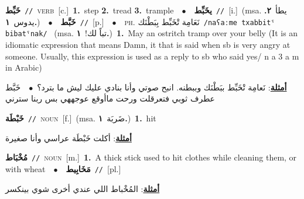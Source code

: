 \documentclass[10pt,a4paper,twoside]{article} %
\begin{document}
\begin{multicols}{2}
{{\setlength\topsep{0pt}\textbf{\foreignlanguage{arabic}{خَبِّط}}\ {\color{gray}\texttt{//}\color{black}}\ \textsc{verb}\ [c.]\ \textbf{1.}~step  \textbf{2.}~tread  \textbf{3.}~trample\ \ $\bullet$\ \ \setlength\topsep{0pt}\textbf{\foreignlanguage{arabic}{يخَبِّط}}\ {\color{gray}\texttt{//}\color{black}}\ [i.]\ \color{gray}(msa. \foreignlanguage{arabic}{يطأ}~\foreignlanguage{arabic}{\textbf{٢.}}  \foreignlanguage{arabic}{يدوس}~\foreignlanguage{arabic}{\textbf{١.}})\color{black}\ \ $\bullet$\ \ \setlength\topsep{0pt}\textbf{\foreignlanguage{arabic}{خَبَّط}}\ {\color{gray}\texttt{//}\color{black}}\ [p.]\ \ $\bullet$\ \ \textsc{ph.} \color{gray} \foreignlanguage{arabic}{نَعَامِة تْخَبِّط بِبَطْنَك}\color{black}\ {\color{gray}\texttt{/{\sffamily naʕaːme txabbitˤ bibatˤnak}/}\color{black}}\ \color{gray} (msa. \foreignlanguage{arabic}{تباً لك!}~\foreignlanguage{arabic}{\textbf{١.}})\color{black}\ \textbf{1.}~May an ostritch tramp over your belly (It is an idiomatic expression that means Damn, it that is said when sb is very angry at someone. Usually, this expression is used as a reply to sb who said yes/ n a 3 a m in Arabic)\  \begin{flushright}\color{gray}\foreignlanguage{arabic}{\textbf{\underline{\foreignlanguage{arabic}{أمثلة}}}: نَعامِة تْخَبِّط ببَطْنَك وببطنه. انبح صوتي وأنا بنادي عليك ليش ما بترد؟\ $\bullet$\ \  خَبَّط عطرف ثوبي فتعرقلت ورحت ماأوقع عوجههي بس ربنا سترني}\end{flushright}\color{black}} \vspace{2mm}

{\setlength\topsep{0pt}\textbf{\foreignlanguage{arabic}{خَبْطَة}}\ {\color{gray}\texttt{//}\color{black}}\ \textsc{noun}\ [f.]\ \color{gray}(msa. \foreignlanguage{arabic}{ضَربَة}~\foreignlanguage{arabic}{\textbf{١.}})\color{black}\ \textbf{1.}~hit\  \begin{flushright}\color{gray}\foreignlanguage{arabic}{\textbf{\underline{\foreignlanguage{arabic}{أمثلة}}}: أكلت خَبْطَة عراسي وأنا صغيرة}\end{flushright}\color{black}} \vspace{2mm}

{\setlength\topsep{0pt}\textbf{\foreignlanguage{arabic}{مُخْبَاط}}\ {\color{gray}\texttt{//}\color{black}}\ \textsc{noun}\ [m.]\ \textbf{1.}~A thick stick used to hit clothes while cleaning them, or with wheat\ \ $\bullet$\ \ \setlength\topsep{0pt}\textbf{\foreignlanguage{arabic}{مَخَابِيط}}\ {\color{gray}\texttt{//}\color{black}}\ [pl.]\  \begin{flushright}\color{gray}\foreignlanguage{arabic}{\textbf{\underline{\foreignlanguage{arabic}{أمثلة}}}: المُخْباط اللي عندي أخرى شوي بينكسر}\end{flushright}\color{black}} \vspace{2mm}

}
\end{multicols}
\end{document}
